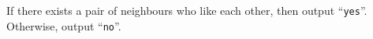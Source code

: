 
  If there exists a pair of neighbours who like each other, then output
  ``\texttt{yes}''. Otherwise, output ``\texttt{no}''.
